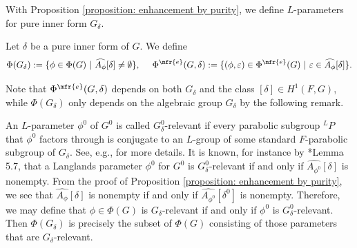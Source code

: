 \documentclass[11pt,letterpaper]{amsart}
\numberwithin{equation}{section}
\begin{document}
With Proposition \ref{proposition: enhancement by purity}, we define $L$-parameters for pure inner form $G_{\delta}$.

\begin{definition}\label{def L-par relevance}
    Let $\delta$ be a pure inner form of $G$. We define  
    \[ \Phi(G_{\delta}):= \{\phi \in \Phi(G) \ | \ \widehat{A_{\phi}}[\delta] \neq \emptyset \},\ \ \ \ \Phi^{\mfr{e}}(G,\delta):= \{(\phi,\varepsilon) \in \Phi^{\mfr{e}}(G) \ | \ \varepsilon \in \widehat{A_{\phi}}[\delta] \}.\]
\end{definition}
Note that $\Phi^{\mfr{e}}(G,\delta)$ depends on both $G_{\delta}$ and the class $[\delta] \in H^1(F,G)$, while $\Phi(G_{\delta})$ only depends on the algebraic group $G_{\delta}$ by the following remark. 




\begin{remark}\label{remark: relevant parameters}
An $L$-parameter $\phi^0$ of $G^0$ is called $G_{\delta}^0$-relevant if every parabolic subgroup ${}^L P$ that $\phi^0$ factors through is conjugate to an $L$-group of some standard $F$-parabolic subgroup of $G_{\delta}$. See, e.g., \cite{Bor79} for more details. It is known, for instance by \cite{Kal16}*{Lemma 5.7}, that a Langlands parameter \(\phi^0\) for \(G^0\) is \(G^0_{\delta}\)-relevant if and only if \(\widehat{A_{\phi^0}}[\delta]\) is nonempty. From the proof of Proposition \ref{proposition: enhancement by purity}, we see that \(\widehat{A_{\phi}}[\delta]\) is nonempty if and only if \(\widehat{A_{\phi^0}}[\delta^0]\) is nonempty. Therefore, we may define that \(\phi \in \Phi(G)\) is \(G_{\delta}\)-relevant if and only if \(\phi^0\) is \(G_{\delta}^0\)-relevant. Then \(\Phi(G_{\delta})\) is precisely the subset of \(\Phi(G)\) consisting of those parameters that are \(G_{\delta}\)-relevant.
\end{remark}
\end{document}
